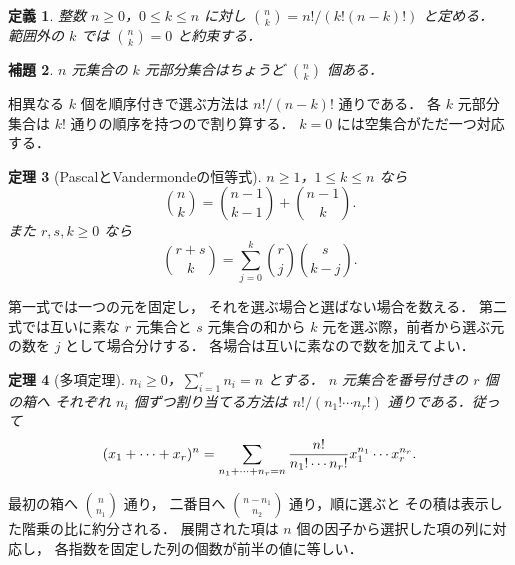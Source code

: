 \documentclass[a5paper,10pt,onecolumn]{jsarticle}
\makeatletter
\theoremstyle{mathnotetheorem}
\newtheorem{theorem}{定理}[section]
\newtheorem{definition}[theorem]{定義}
\newtheorem{lemma}[theorem]{補題}
\renewcommand{\proofname}{証明}
\renewenvironment{proof}[1][\proofname]{%
  \par\pushQED{\qed}\normalfont\topsep4\p@\@plus2\p@\relax
  \trivlist\item[\hskip\labelsep\bfseries #1]\ignorespaces
}{\popQED\endtrivlist\@endpefalse}
\makeatother
\begin{document}
\begin{definition}
整数 $n\ge0$，$0\le k\le n$ に対し
$ {n\choose k}=n!/(k!(n-k)!)$ と定める．
範囲外の $k$ では $ {n\choose k}=0$ と約束する．
\end{definition}
\begin{lemma}\label{lem:choose}
$n$ 元集合の $k$ 元部分集合はちょうど
$ {n\choose k}$ 個ある．
\end{lemma}
\begin{proof}
相異なる $k$ 個を順序付きで選ぶ方法は
$n!/(n-k)!$ 通りである．
各 $k$ 元部分集合は $k!$ 通りの順序を持つので割り算する．
$k=0$ には空集合がただ一つ対応する．
\end{proof}
\begin{theorem}[PascalとVandermondeの恒等式]
$n\ge1$，$1\le k\le n$ なら
\[
 {n\choose k}={n-1\choose k-1}+{n-1\choose k}.
\]
また $r,s,k\ge0$ なら
\[
 {r+s\choose k}=\sum_{j=0}^k{r\choose j}{s\choose k-j}.
\]
\end{theorem}
\begin{proof}
第一式では一つの元を固定し，
それを選ぶ場合と選ばない場合を数える．
第二式では互いに素な $r$ 元集合と $s$ 元集合の和から
$k$ 元を選ぶ際，前者から選ぶ元の数を $j$ として場合分けする．
各場合は互いに素なので数を加えてよい．
\end{proof}
\begin{theorem}[多項定理]
$n_i\ge0$，$\sum_{i=1}^r n_i=n$ とする．
$n$ 元集合を番号付きの $r$ 個の箱へ
それぞれ $n_i$ 個ずつ割り当てる方法は
$n!/(n_1!\cdots n_r!)$ 通りである．従って
\[
 (x_1+\cdots+x_r)^n
 =\sum_{n_1+\cdots+n_r=n}
 {n!\over n_1!\cdots n_r!}x_1^{n_1}\cdots x_r^{n_r}.
\]
\end{theorem}
\begin{proof}
最初の箱へ $ {n\choose n_1}$ 通り，
二番目へ $ {n-n_1\choose n_2}$ 通り，順に選ぶと
その積は表示した階乗の比に約分される．
展開された項は $n$ 個の因子から選択した項の列に対応し，
各指数を固定した列の個数が前半の値に等しい．
\end{proof}
\end{document}
